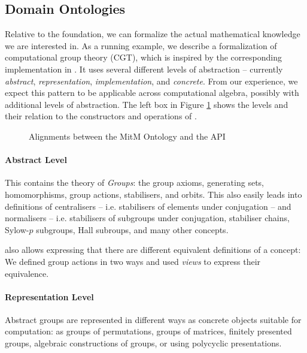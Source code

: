 \subsection{Domain Ontologies}

Relative to the foundation, we can formalize the actual mathematical knowledge we are interested in.
As a running example, we describe a formalization of computational group theory (CGT), which is inspired by the corresponding implementation in \GAP.
It uses several different levels of abstraction -- currently \emph{abstract}, \emph{representation}, \emph{implementation}, and \emph{concrete}.
From our experience, we expect this pattern to be applicable across computational algebra, possibly with additional levels of abstraction. 
The left box in Figure \ref{fig:cgtontology} shows the levels and their relation to the constructors and operations of \GAP.

\begin{figure}[ht]\centering
  \caption{Alignments between the MitM Ontology and the \GAP API}\label{fig:cgtontology}
\end{figure}

\paragraph{Abstract Level} This contains the theory of \emph{Groups}: the group
axioms, generating sets, homomorphisms, group actions, stabilisers, and orbits.
This also easily leads into definitions of centralisers -- i.e. stabilisers of
elements under conjugation -- and normalisers -- i.e. stabilisers of subgroups
under conjugation, stabiliser chains, Sylow-$p$ subgroups, Hall subroups, and
many other concepts.

\OMMT also allows expressing that there are different equivalent definitions of
a concept: We defined group actions in two ways and used \emph{views} to express
their equivalence.

\paragraph{Representation Level} 
Abstract groups are represented in different ways as concrete objects
suitable for computation: as groups of permutations, groups of matrices,
finitely presented groups, algebraic constructions of groups, or using
polycyclic presentations.


